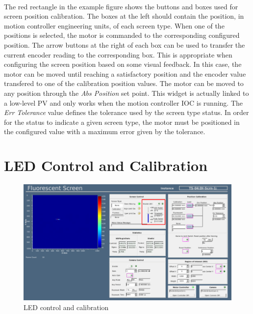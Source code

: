 \documentclass[openany]{article}
\begin{document}
    \paragraph{} The red rectangle in the example figure shows the buttons and boxes used for screen position calibration. The boxes at the left should contain the position, in motion controller engineering units, of each screen type. When one of the positions is selected, the motor is commanded to the corresponding configured position. The arrow buttons at the right of each box can be used to transfer the current encoder reading to the corresponding box. This is appropriate when configuring the screen position based on some visual feedback. In this case, the motor can be moved until reaching a satisfactory position and the encoder value transfered to one of the calibration position values. The motor can be moved to any position through the \emph{Abs Position} set point. This widget is actually linked to a low-level PV and only works when the motion controller IOC is running. The \emph{Err Tolerance} value defines the tolerance used by the screen type status. In order for the status to indicate a given screen type, the motor must be positioned in the configured value with a maximum error given by the tolerance.

\section{LED Control and Calibration}

    \begin{figure}[!h]
        \caption{LED control and calibration}
        \label{fig:opi-led-cal}
        \centering
        \includegraphics[width=1.0\textwidth]{screen_opi_led_cal}
    \end{figure}
    \FloatBarrier
\end{document}
